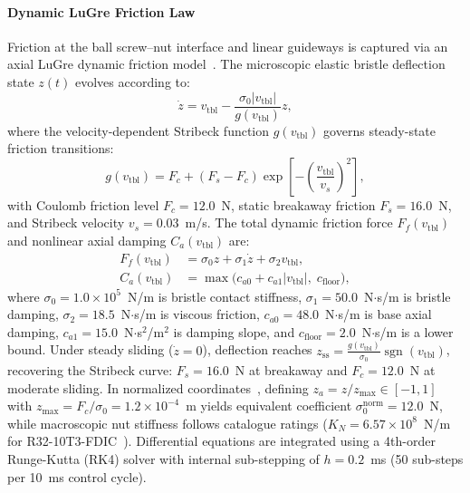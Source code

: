 \documentclass[a4paper,fleqn]{cas-dc}
\begin{document}
\paragraph{Dynamic LuGre Friction Law}
Friction at the ball screw--nut interface and linear guideways is captured via an axial LuGre dynamic friction model~\cite{CanudasDeWit_1995, PriorWork_MSSP_2026, Wan_2025}. The microscopic elastic bristle deflection state $z(t)$ evolves according to:
\begin{equation}
    \dot{z} = v_{\mathrm{tbl}} - \frac{\sigma_0 |v_{\mathrm{tbl}}|}{g(v_{\mathrm{tbl}})} z,
    \label{eq:lugre_state_eq}
\end{equation}
where the velocity-dependent Stribeck function $g(v_{\mathrm{tbl}})$ governs steady-state friction transitions:
\begin{equation}
    g(v_{\mathrm{tbl}}) = F_c + (F_s - F_c) \exp\left[-\left(\frac{v_{\mathrm{tbl}}}{v_s}\right)^2\right],
    \label{eq:stribeck_func}
\end{equation}
with Coulomb friction level $F_c = 12.0$~N, static breakaway friction $F_s = 16.0$~N, and Stribeck velocity $v_s = 0.03$~m/s. The total dynamic friction force $F_f(v_{\mathrm{tbl}})$ and nonlinear axial damping $C_a(v_{\mathrm{tbl}})$ are:
\begin{align}
    F_f(v_{\mathrm{tbl}}) &= \sigma_0 z + \sigma_1 \dot{z} + \sigma_2 v_{\mathrm{tbl}}, \label{eq:lugre_force_eq} \\
    C_a(v_{\mathrm{tbl}}) &= \max\bigl(c_{a0} + c_{a1}|v_{\mathrm{tbl}}|, \; c_{\mathrm{floor}}\bigr), \label{eq:viscous_floor}
\end{align}
where $\sigma_0 = 1.0 \times 10^5$~N/m is bristle contact stiffness, $\sigma_1 = 50.0$~N$\cdot$s/m is bristle damping, $\sigma_2 = 18.5$~N$\cdot$s/m is viscous friction, $c_{a0} = 48.0$~N$\cdot$s/m is base axial damping, $c_{a1} = 15.0$~N$\cdot$s$^2$/m$^2$ is damping slope, and $c_{\mathrm{floor}} = 2.0$~N$\cdot$s/m is a lower bound. Under steady sliding ($\dot{z} = 0$), deflection reaches $z_{\mathrm{ss}} = \frac{g(v_{\mathrm{tbl}})}{\sigma_0} \operatorname{sgn}(v_{\mathrm{tbl}})$, recovering the Stribeck curve: $F_s = 16.0$~N at breakaway and $F_c = 12.0$~N at moderate sliding. In normalized coordinates~\cite{PriorWork_MSSP_2026}, defining $z_a = z / z_{\mathrm{max}} \in [-1, 1]$ with $z_{\mathrm{max}} = F_c / \sigma_0 = 1.2 \times 10^{-4}$~m yields equivalent coefficient $\sigma_0^{\mathrm{norm}} = 12.0$~N, while macroscopic nut stiffness follows catalogue ratings ($K_N = 6.57 \times 10^8$~N/m for R32-10T3-FDIC~\cite{PMI_Catalog}). Differential equations are integrated using a 4th-order Runge-Kutta (RK4) solver with internal sub-stepping of $h = 0.2$~ms (50 sub-steps per 10~ms control cycle).
\end{document}
